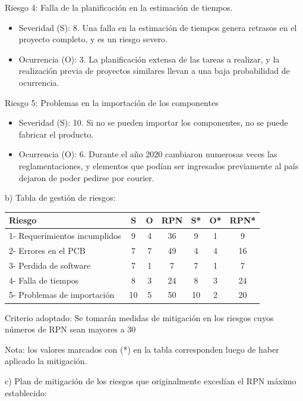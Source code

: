 \documentclass[11pt]{charter}
\begin{document}
Riesgo 4: Falla de la planificación en la estimación de tiempos.
\begin{itemize}
\item Severidad (S): 8. Una falla en la estimación de tiempos genera retrasos en el proyecto completo, y es un riesgo severo.
\item Ocurrencia (O): 3. La planificación extensa de las tareas a realizar, y la realización previa de proyectos similares llevan a una baja probabilidad de ocurrencia.
\end{itemize}

Riesgo 5: Problemas en la importación de los componentes
\begin{itemize}
\item Severidad (S): 10. Si no se pueden importar los componentes, no se puede fabricar el producto.
\item Ocurrencia (O): 6. Durante el año 2020 cambiaron numerosas veces las reglamentaciones, y elementos que podían ser ingresados previamente al país dejaron de poder pedirse por courier.
\end{itemize}


b) Tabla de gestión de riesgos:

\begin{table}[htpb]
\centering
\begin{tabularx}{\linewidth}{@{}|X|c|c|c|c|c|c|@{}}
\hline
\rowcolor[HTML]{C0C0C0} 
Riesgo & S & O & RPN & S* & O* & RPN* \\ \hline
1- Requerimientos incumplidos   &  9 & 4  &  36   &  9  &  1  &  9    \\ \hline
2- Errores en el PCB   &  7 & 7  &  49   &  4  &  4  &   16   \\ \hline
3- Perdida de software       &  7 & 1  &  7   & 7   &  1  &  7    \\ \hline
4- Falla de tiempos      & 8  &  3 &  24   & 8   & 3   &  24    \\ \hline
5- Problemas de importación  & 10  & 5  &  50   &  10  &  2  &  20    \\ \hline
\end{tabularx}%
\end{table}

Criterio adoptado: 
Se tomarán medidas de mitigación en los riesgos cuyos números de RPN sean mayores a 30

Nota: los valores marcados con (*) en la tabla corresponden luego de haber aplicado la mitigación.

c) Plan de mitigación de los riesgos que originalmente excedían el RPN máximo establecido:
 
\end{document}
